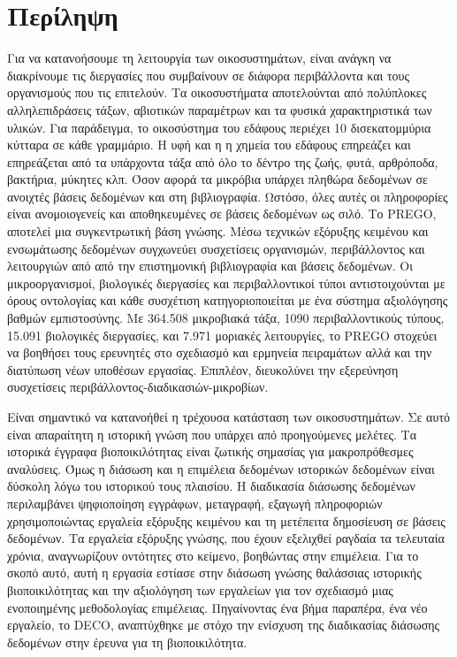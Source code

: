 \documentclass[11pt]{article}
\begin{document}
\section*{Περίληψη}

Για να κατανοήσουμε τη λειτουργία των οικοσυστημάτων, είναι ανάγκη να διακρίνουμε
τις διεργασίες που συμβαίνουν σε διάφορα περιβάλλοντα και τους οργανισμούς
που τις επιτελούν. Τα οικοσυστήματα αποτελούνται από πολύπλοκες αλληλεπιδράσεις τάξων,
αβιοτικών παραμέτρων και τα φυσικά χαρακτηριστικά των υλικών. Για παράδειγμα,
το οικοσύστημα του εδάφους περιέχει 10 δισεκατομμύρια κύτταρα σε κάθε γραμμάριο. Η υφή και η
η χημεία του εδάφους επηρεάζει και επηρεάζεται από τα υπάρχοντα τάξα από όλο το
δέντρο της ζωής, φυτά, αρθρόποδα, βακτήρια, μύκητες κλπ. Όσον αφορά τα μικρόβια
υπάρχει πληθώρα δεδομένων σε ανοιχτές βάσεις δεδομένων και στη
βιβλιογραφία. Ωστόσο, όλες αυτές οι πληροφορίες είναι ανομοιογενείς και αποθηκευμένες σε 
βάσεις δεδομένων ως σιλό. Το \textlatin{PREGO}, αποτελεί μια συγκεντρωτική βάση γνώσης. Μέσω
τεχνικών εξόρυξης κειμένου και ενσωμάτωσης δεδομένων συγχωνεύει 
συσχετίσεις οργανισμών, περιβάλλοντος και λειτουργιών από
από την επιστημονική βιβλιογραφία και βάσεις δεδομένων. 
Οι μικροοργανισμοί, βιολογικές διεργασίες και περιβαλλοντικοί τύποι αντιστοιχούνται
με όρους οντολογίας και κάθε συσχέτιση κατηγοριοποιείται με ένα σύστημα αξιολόγησης 
βαθμών εμπιστοσύνης.
Με 364.508 μικροβιακά τάξα, 1090 περιβαλλοντικούς τύπους, 15.091 βιολογικές διεργασίες,
και 7.971 μοριακές λειτουργίες, το \textlatin{PREGO} στοχεύει να βοηθήσει τους ερευνητές στο 
σχεδιασμό και ερμηνεία πειραμάτων αλλά και την διατύπωση νέων υποθέσων εργασίας. Επιπλέον, διευκολύνει την εξερεύνηση
συσχετίσεις περιβάλλοντος-διαδικασιών-μικροβίων.

Είναι σημαντικό να κατανοήθεί η τρέχουσα κατάσταση των οικοσυστημάτων. Σε αυτό είναι
απαραίτητη η ιστορική γνώση που υπάρχει από προηγούμενες μελέτες.
Τα ιστορικά έγγραφα βιοποικιλότητας είναι ζωτικής σημασίας για
μακροπρόθεσμες αναλύσεις. Όμως η διάσωση και η επιμέλεια δεδομένων ιστορικών δεδομένων είναι δύσκολη λόγω του ιστορικού τους
πλαισίου. Η διαδικασία διάσωσης δεδομένων περιλαμβάνει ψηφιοποίηση εγγράφων, μεταγραφή, εξαγωγή πληροφοριών
χρησιμοποιώντας εργαλεία εξόρυξης κειμένου και τη μετέπειτα δημοσίευση σε βάσεις δεδομένων.
Τα εργαλεία εξόρυξης γνώσης, που έχουν εξελιχθεί ραγδαία τα τελευταία χρόνια,
αναγνωρίζουν οντότητες στο κείμενο, βοηθώντας στην επιμέλεια.
Για το σκοπό αυτό, αυτή η εργασία εστίασε στην διάσωση γνώσης θαλάσσιας ιστορικής βιοποικιλότητας και την
αξιολόγηση των εργαλείων για τον σχεδιασμό μιας ενοποιημένης μεθοδολογίας επιμέλειας. 
Πηγαίνοντας ένα βήμα παραπέρα, ένα νέο εργαλείο, το \textlatin{DECO}, αναπτύχθηκε
με στόχο την ενίσχυση της διαδικασίας διάσωσης δεδομένων στην έρευνα για τη βιοποικιλότητα.
\end{document}
